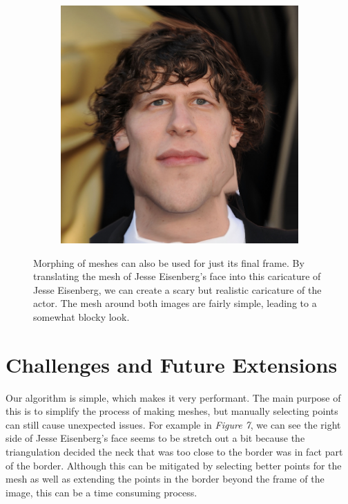 \documentclass[a4paper]{article}
\begin{document}
\begin{figure}[H]
\begin{subfigure}{0.3\textwidth}
    \end{subfigure}
    \begin{subfigure}{0.3\textwidth}
        \includegraphics[width=\textwidth]{../frames/caricuture/caricuture_eisenberg_019.png}
    \end{subfigure}

    \caption{Morphing of meshes can also be used for just its final frame. By translating the mesh of Jesse Eisenberg's face into this caricature of Jesse Eisenberg, we can create a scary but realistic caricature of the actor. The mesh around both images are fairly simple, leading to a somewhat blocky look.}
\end{figure}

\section*{Challenges and Future Extensions}

Our algorithm is simple, which makes it very performant. The main purpose of this is to simplify the process of making meshes, but manually selecting points can still cause unexpected issues. For example in \textit{Figure 7}, we can see the right side of Jesse Eisenberg's face seems to be stretch out a bit because the triangulation decided the neck that was too close to the border was in fact part of the border. Although this can be mitigated by selecting better points for the mesh as well as extending the points in the border beyond the frame of the image, this can be a time consuming process.
\end{document}
